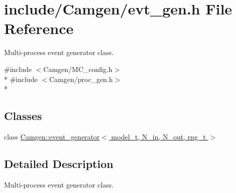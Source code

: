 \hypertarget{a00616}{\section{include/\-Camgen/evt\-\_\-gen.h File Reference}
\label{a00616}
}


Multi-\/process event generator class.  


{\ttfamily \#include $<$Camgen/\-M\-C\-\_\-config.\-h$>$}\\*
{\ttfamily \#include $<$Camgen/proc\-\_\-gen.\-h$>$}\\*
\subsection*{Classes}
\begin{DoxyCompactItemize}
\item 
class \hyperlink{a00210}{Camgen\-::event\-\_\-generator$<$ model\-\_\-t, N\-\_\-in, N\-\_\-out, rng\-\_\-t $>$}
\end{DoxyCompactItemize}


\subsection{Detailed Description}
Multi-\/process event generator class. 